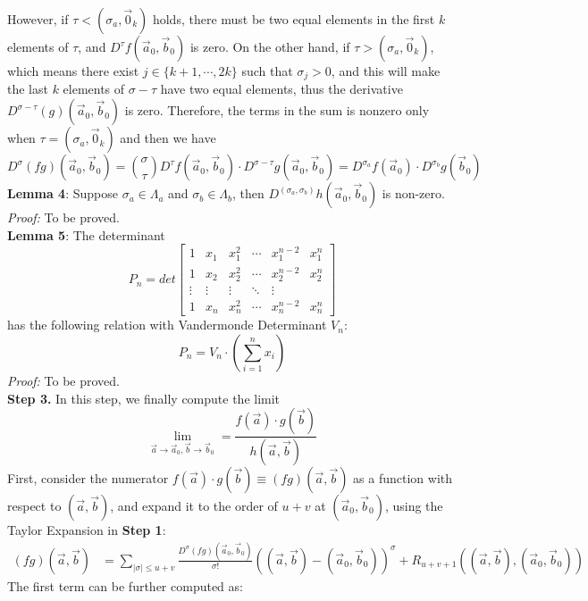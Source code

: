 \documentclass[12pt]{article}
\begin{document}
However, if $\tau< (\sigma_{a},\vec{0}_{k})$ holds, there must be two equal elements in the first $k$ elements of $\tau$, and $D^{\tau}f(\vec{a}_{0},\vec{b}_{0})$ is zero. On the other hand, if $\tau> (\sigma_{a},\vec{0}_{k})$, which means there exist $j\in\{k+1,\cdots,2k\}$ such that $\sigma_{j}>0$, and this will make the last $k$ elements of $\sigma-\tau$ have two equal elements, thus the derivative $D^{\sigma-\tau}(g)(\vec{a}_{0},\vec{b}_{0})$ is zero. Therefore, the terms in the sum is nonzero only when $\tau=(\sigma_{a},\vec{0}_{k})$ and then we have $$D^{\sigma}(fg)(\vec{a}_{0},\vec{b}_{0})=\binom{\sigma}{\tau}D^{\tau}f(\vec{a}_{0},\vec{b}_{0})\cdot D^{\sigma-\tau}g(\vec{a}_{0},\vec{b}_{0})=D^{\sigma_{a}}f(\vec{a}_{0})\cdot D^{\sigma_{b}}g(\vec{b}_{0})$$
\textbf{Lemma 4}: Suppose $\sigma_{a}\in \Lambda_{a}$ and $\sigma_{b}\in \Lambda_{b}$, then $D^{(\sigma_{a},\sigma_{b})}h(\vec{a}_{0},\vec{b}_{0})$ is non-zero.\\
\emph{Proof:} To be proved.\\
\textbf{Lemma 5}: The determinant
$$P_n = det \begin{bmatrix} 1 & x_1 & x_1^2 & \cdots & x_1^{n-2} & x_1^{n} \\ 1 &x_2 & x_2^2 & \cdots & x_2^{n-2} & x_2^{n}\\ \vdots & \vdots & \vdots & \ddots & \vdots \\ 1 &x_n & x_n^2 & \cdots & x_n^{n-2} & x_n^{n} \end{bmatrix}$$ has the following relation with Vandermonde Determinant $V_{n}$:
$$P_{n}=V_{n}\cdot (\sum_{i=1}^{n}x_{i})$$
\emph{Proof:} To be proved.\\
\textbf{Step 3. }In this step, we finally compute the limit $$\lim_{\vec{a}\rightarrow \vec{a}_{0},\vec{b}\rightarrow \vec{b}_{0}}=\frac{f(\vec{a})\cdot g(\vec{b})}{h(\vec{a},\vec{b})}$$
First, consider the numerator $f(\vec{a})\cdot g(\vec{b})\equiv (fg)(\vec{a},\vec{b})$ as a function with respect to $(\vec{a},\vec{b})$, and expand it to the order of $u+v$ at $(\vec{a}_{0},\vec{b}_{0})$, using the Taylor Expansion in \textbf{Step 1}:
\begin{align*}
	(fg)(\vec{a},\vec{b})&=\sum_{|\sigma|\leqslant u+v}\frac{D^{\sigma}(fg)(\vec{a}_{0},\vec{b}_{0})}{\sigma!}((\vec{a},\vec{b})-(\vec{a}_{0},\vec{b}_{0}))^{\sigma}+R_{u+v+1}((\vec{a},\vec{b}),(\vec{a}_{0},\vec{b}_{0}))
\end{align*} 
The first term can be further computed as:
\end{document}
